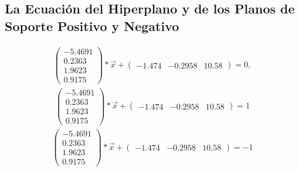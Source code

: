 \documentclass[fleqn]{llncs}
\begin{document}
\subsection{La Ecuación del Hiperplano y de los Planos de Soporte Positivo y Negativo}
\begin{align*}
	\begin{pmatrix}
		-5.4691 \\
		0.2363 \\
		1.9623 \\
		0.9175
		\end{pmatrix} * \overrightarrow{x} + \begin{pmatrix}
		-1.474 & -0.2958 & 10.58
		\end{pmatrix} = 0,
\end{align*}
\begin{align*}
	\begin{pmatrix}
		-5.4691 \\
		0.2363 \\
		1.9623 \\
		0.9175
	\end{pmatrix} * \overrightarrow{x} + \begin{pmatrix}
		-1.474 & -0.2958 & 10.58
	\end{pmatrix} = 1
\end{align*}
\begin{align*}
	\begin{pmatrix}
		-5.4691 \\
		0.2363 \\
		1.9623 \\
		0.9175
	\end{pmatrix} * \overrightarrow{x} + \begin{pmatrix}
		-1.474 & -0.2958 & 10.58
	\end{pmatrix} = -1
\end{align*}
\end{document}
